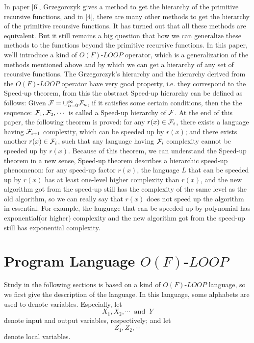In paper [6], Grzegorczyk gives a 
method to get the hierarchy
of the primitive recursive functions, and in [4], there are
many other methods to get the hierarchy of the primitive 
recursive functions. It has turned out that all 
these methods are 
equivalent. But it still remains a big question 
that how we can 
generalize these methods to the functions beyond 
the primitive 
recursive functions. In this paper, we'll introduce 
a kind of 
$O(F)$-$LOOP$ operator, which is a generalization 
of the methods
mentioned above and by which we can get a 
hierarchy of any set of 
recursive functions. The Grzegorczyk's
hierarchy and the hierarchy derived from the 
$O(F)$-$LOOP$ operator
have very good property, i.e. they correspond to 
the Speed-up 
theorem, from this the abstract Speed-up hierarchy 
can be defined as follows:
Given ${\cal F}=\cup^\infty_{n=0}{\cal F}_n$, if it 
satisfies some 
certain conditions, then the the sequence: ${\cal F}_1,{\cal F}_2,
\cdots$ is called a Speed-up hierarchy of 
${\cal F}$. At the end of this paper,
the following theorem is proved: for any 
$r(x)\in{\cal F}_i$,
there exists a language having ${\cal F}_{i+1}$ 
complexity, which 
can be speeded up by $r(x)$; and there exists 
another $r(x)\in{\cal F}_i$, such that any language having ${\cal F}_i$ 
complexity cannot 
be speeded up by $r(x)$. Because of this theorem, 
we can
understand the Speed-up theorem in a new sense, 
Speed-up theorem describes a
hierarchic speed-up phenomenon: for any speed-up 
factor $r(x)$, the language
$L$ that can be speeded up by $r(x)$ has at 
least one-level higher
complexity than $r(x)$, and the new algorithm 
got from the speed-up
still has the complexity of the same level as the old
algorithm, so we can really say that $r(x)$ does 
not speed up the
algorithm in essential. For example, the language 
that can be 
speeded up by polynomial has exponential(or higher) 
complexity and
the new algorithm got from the speed-up still has 
exponential
complexity.

\section{Program Language $O(F)$-$LOOP$}

Study in the following sections is based on 
a kind of $O(F)$-$LOOP$
language, so we first give the description 
of the language. In 
this language, some alphabets are used to 
denote variables.
Especially, let
$$X_1,X_2,\cdots\ \mbox{ and }\ Y$$
denote input and output variables, respectively; and let
$$Z_1,Z_2,\cdots$$
denote local variables.

